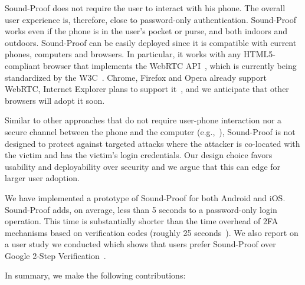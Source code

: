 Sound-Proof does not require the user to interact with his phone. The overall user experience is, therefore, close to password-only authentication.
Sound-Proof works even if the phone is in the user's pocket or purse, and both indoors and outdoors. Sound-Proof can be easily deployed since it is compatible with current phones, computers and browsers. In particular, it works with any HTML5-compliant browser that implements the WebRTC API~\cite{webrtc}, which is currently being standardized by the W3C~\cite{webrtcw3c}.
Chrome, Firefox and Opera already support WebRTC, Internet Explorer plans to support it~\cite{iewebrtc}, and we anticipate that other browsers will adopt it soon.

Similar to other approaches that do not require user-phone interaction nor a secure channel between the phone and the computer (e.g.,~\cite{czeskis12ccs}),
Sound-Proof is not designed to protect against targeted attacks where the attacker is co-located with the victim and has the victim's login credentials.
Our design choice favors usability and deployability over security and we argue that this can edge for larger user adoption.

We have implemented a prototype of Sound-Proof for both Android and iOS.
Sound-Proof adds, on average, less than 5 seconds to a password-only login operation.
This time is substantially shorter than the time overhead of 2FA mechanisms based on verification codes (roughly 25 seconds~\cite{weir09compsec}).
We also report on a user study we conducted which shows that users prefer Sound-Proof over Google 2-Step Verification~\cite{google_authentication}.

In summary, we make the following contributions:

